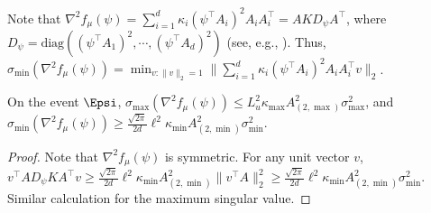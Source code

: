 Note that $\nabla^2f_{\mu}(\psi) = \sum_{i=1}^{d} \kappa_i(\psi^{\top}A_i)^2A_iA_i^{\top} = AKD_{\psi}A^{\top}$,  where $D_{\psi} = \text{diag}\left((\psi^{\top}A_1)^2,\cdots, (\psi^{\top}A_d)^2\right)$ (see, e.g., \citealt{hsu2013learning}). 
Thus, $\sigma_{\min}(\nabla^2f_{\mu}(\psi)) = \min_{v:\|v\|_2=1}\|\sum_{i=1}^{d} \kappa_i(\psi^{\top}A_i)^2A_iA_i^{\top}v\|_2$. 
\begin{lemma}
\label{lem:boundsigmaminnabla}
On the event $\Epsi$, $\sigma_{\max}(\nabla^2f_{\mu}(\psi)) \le L_u^2 \kappa_{\max}A^2_{(2,\max)}\sigma_{\max}^2$, and
 $\sigma_{\min}(\nabla^2f_{\mu}(\psi)) \ge \frac{\sqrt{2\pi}}{2d} \ell^2\kappa_{\min}A^2_{(2,\min)}\sigma_{\min}^2$.
\end{lemma}
\begin{proof}
Note that $\nabla^2f_{\mu}(\psi)$ is symmetric. 
For any unit vector $v$, $v^{\top}AD_{\psi}KA^{\top}v \ge \frac{\sqrt{2\pi}}{2d}\ell^2\kappa_{\min} A^2_{(2,\min)}\|v^{\top}A\|_2^2 \ge \frac{\sqrt{2\pi}}{2d}\ell^2\kappa_{\min}A^2_{(2,\min)}\sigma_{\min}^2$. Similar calculation for the maximum singular value.
\end{proof}

